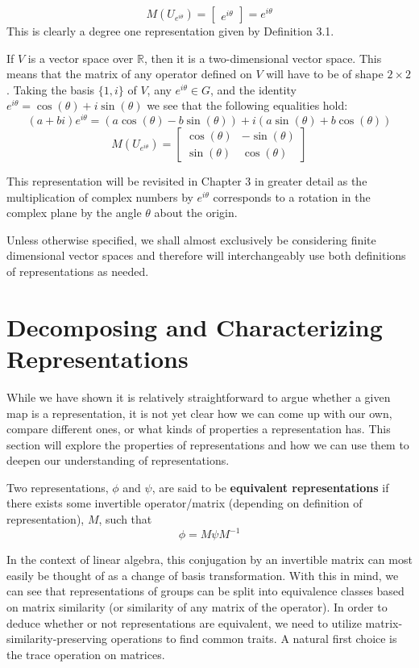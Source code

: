 $$M(U_{e^{i\theta}}) = \begin{bmatrix}
					e^{i\theta}
				\end{bmatrix} = e^{i\theta} $$
This is clearly a degree one representation given by Definition 3.1.

If $V$ is a vector space over $\mathbb{R}$, then it is a two-dimensional vector space. This means that the matrix of any operator defined on $V$ will have to be of shape $2\times2$. Taking the basis $\{1,i\}$ of $V$, any $e^{i\theta} \in G$, and the identity $e^{i\theta} = \cos(\theta) + i\sin(\theta)$ we see that the following equalities hold:
$$(a+bi)e^{i\theta} = (a\cos(\theta)-b\sin(\theta))+i(a\sin(\theta)+b\cos(\theta))$$
$$M(U_{e^{i\theta}}) = \begin{bmatrix}
					\cos(\theta) & -\sin(\theta) \\
                                        \sin(\theta) & \cos(\theta)
				\end{bmatrix}$$

This representation will be revisited in Chapter 3 in greater detail as the multiplication of complex numbers by $e^{i\theta}$ corresponds to a rotation in the complex plane by the angle $\theta$ about the origin.

Unless otherwise specified, we shall almost exclusively be considering finite dimensional vector spaces and therefore will interchangeably use both definitions of representations as needed.

\section{Decomposing and Characterizing Representations}

While we have shown it is relatively straightforward to argue whether a given map is a representation, it is not yet clear how we can come up with our own, compare different ones, or what kinds of properties a representation has. This section will explore the properties of representations and how we can use them to deepen our understanding of representations.

\begin{definition}
	Two representations, $\phi$ and $\psi$, are said to be \textbf{equivalent representations} if there exists some invertible operator/matrix (depending on definition of representation), $M$, such that $$\phi = M \psi M^{-1}$$
\end{definition}

In the context of linear algebra, this conjugation by an invertible matrix can most easily be thought of as a change of basis transformation. With this in mind, we can see that representations of groups can be split into equivalence classes based on matrix similarity (or similarity of any matrix of the operator). In order to deduce whether or not representations are equivalent, we need to utilize matrix-similarity-preserving operations to find common traits. A natural first choice is the trace operation on matrices.

